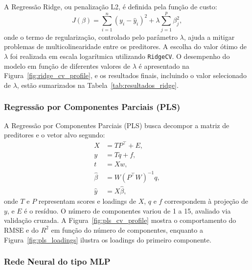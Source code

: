 A Regressão Ridge, ou penalização L2, é definida pela função de custo:
\begin{equation}
    J(\beta) = \sum_{i=1}^{n} (y_i - \hat{y}_i)^2 + \lambda \sum_{j=1}^{p} \beta_j^2,
\end{equation}
onde o termo de regularização, controlado pelo parâmetro $\lambda$, ajuda a mitigar problemas de multicolinearidade entre os preditores. A escolha do valor ótimo de $\lambda$ foi realizada em escala logarítmica utilizando \texttt{RidgeCV}. O desempenho do modelo em função de diferentes valores de $\lambda$ é apresentado na Figura~\ref{fig:ridge_cv_profile}, e os resultados finais, incluindo o valor selecionado de $\lambda$, estão sumarizados na Tabela~\ref{tab:resultados_ridge}.


\subsubsection{Regressão por Componentes Parciais (PLS)}

A Regressão por Componentes Parciais (PLS) busca decompor a matriz de preditores e o vetor alvo segundo:
\begin{align}
X &= TP^\top + E, \\
y &= Tq + f, \\
t &= Xw, \\
\hat{\beta} &= W (P^\top W)^{-1} q, \\
\hat{y} &= X \hat{\beta},
\end{align}
onde $T$ e $P$ representam scores e loadings de $X$, $q$ e $f$ correspondem à projeção de $y$, e $E$ é o resíduo. O número de componentes variou de 1 a 15, avaliado via validação cruzada. A Figura~\ref{fig:pls_cv_profile} mostra o comportamento do RMSE e do $R^2$ em função do número de componentes, enquanto a Figura~\ref{fig:pls_loadings} ilustra os loadings do primeiro componente.


\subsubsection{Rede Neural do tipo MLP}

